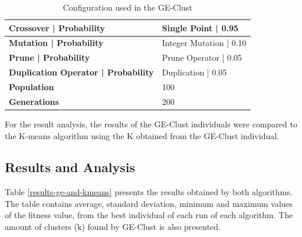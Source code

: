 \documentclass[conference,compsoc]{IEEEtran}
\begin{document}
\begin{table}[]
	\centering
	\caption{Configuration used in the GE-Clust}
	\label{ge-configuration}
	\begin{tabular}{|l|l|}
		\hline
		\textbf{Crossover  |  Probability}         & Single Point  | 0.95     \\ \hline
		\textbf{Mutation | Probability}            & Integer Mutation          |  0.10 \\ \hline
		\textbf{Prune  | Probability}      & Prune Operator           | 0.05   \\ \hline
		\textbf{Duplication Operator | Probability} & Duplication   | 0.05     \\ \hline
		\textbf{Population}                        & 100                               \\ \hline
		\textbf{Generations}                       & 200                               \\ \hline
	\end{tabular}
\end{table}


For the result analysis, the results of the GE-Clust individuals were compared to the K-means algorithm using the K obtained from the GE-Clust individual.


\subsection{Results and Analysis}


Table \ref{results-ge-and-kmeans} presents the results obtained by both algorithms. The table contains average, 
standard deviation, minimum and maximum values of the fitness value, from the best individual of each run of each algorithm. The amount of clusters (k) found by GE-Clust is also presented.
\end{document}
